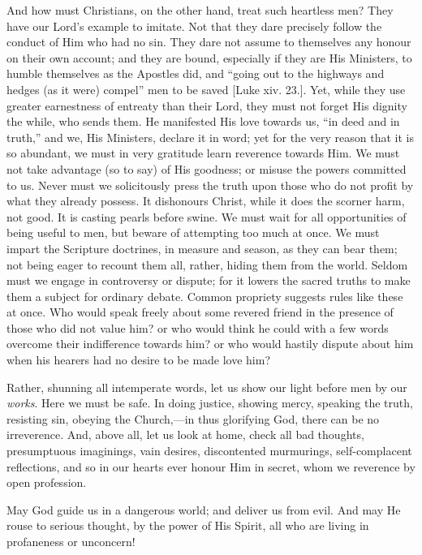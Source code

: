 And how must Christians, on the other hand, treat such
heartless men? They have our Lord's example to imitate.
Not that they dare precisely follow the conduct of Him
who had no sin. They dare not assume to themselves any
honour on their own account; and they are bound,
especially if they are His Ministers, to humble
themselves as the Apostles did, and ``going out to
the highways and hedges (as it were) compel'' men to
be saved [Luke xiv. 23.]. Yet, while they use greater
earnestness of entreaty than their Lord, they must not
forget His dignity the while, who sends them. He
manifested His love towards us, ``in deed and in
truth,'' and we, His Ministers, declare it in word;
yet for the very reason that it is so abundant, we must
in very gratitude learn reverence towards Him. We must
not take advantage (so to say) of His goodness; or misuse
the powers committed to us. Never must we solicitously
press the truth upon those who do not profit by what they
already possess. It dishonours Christ, while it does the
scorner harm, not good. It is casting pearls before
swine. We must wait for all opportunities of being useful
to men, but beware of attempting too much at once. We
must impart the Scripture doctrines, in measure and
season, as they can bear them; not being eager to recount
them all, rather, hiding them from the world. Seldom must
we engage in controversy or dispute; for it lowers the
sacred truths to make them a subject for ordinary debate.
Common propriety suggests rules like these at once. Who
would speak freely about some revered friend in the
presence of those who did not value him? or who would
think he could with a few words overcome their
indifference towards him? or who would hastily dispute
about him when his hearers had no desire to be made love
him?

Rather, shunning all intemperate words, let us show
our light before men by our \emph{works}. Here we must be
safe. In doing justice, showing mercy, speaking the
truth, resisting sin, obeying the Church,—in thus
glorifying God, there can be no irreverence. And, above
all, let us look at home, check all bad thoughts,
presumptuous imaginings, vain desires, discontented
murmurings, self-complacent reflections, and so in our
hearts ever honour Him in secret, whom we reverence by
open profession.

May God guide us in a dangerous world; and deliver us
from evil. And may He rouse to serious thought, by the
power of His Spirit, all who are living in profaneness or
unconcern!


